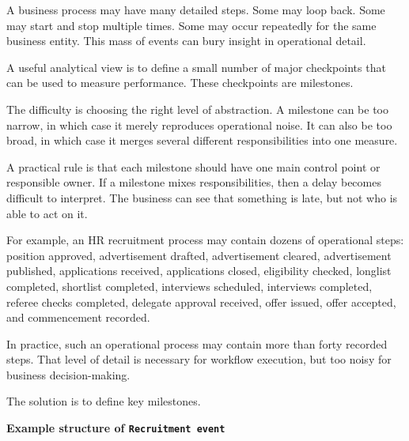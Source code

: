 \documentclass[10pt,openany,10pt]{book}
\begin{document}
A business process may have many detailed steps. Some may loop back.
Some may start and stop multiple times. Some may occur repeatedly for
the same business entity. This mass of events can bury insight in
operational detail.

A useful analytical view is to define a small number of major
checkpoints that can be used to measure performance. These checkpoints
are milestones.

The difficulty is choosing the right level of abstraction. A milestone
can be too narrow, in which case it merely reproduces operational noise.
It can also be too broad, in which case it merges several different
responsibilities into one measure.

A practical rule is that each milestone should have one main control
point or responsible owner. If a milestone mixes responsibilities, then
a delay becomes difficult to interpret. The business can see that
something is late, but not who is able to act on it.

For example, an HR recruitment process may contain dozens of operational
steps: position approved, advertisement drafted, advertisement cleared,
advertisement published, applications received, applications closed,
eligibility checked, longlist completed, shortlist completed, interviews
scheduled, interviews completed, referee checks completed, delegate
approval received, offer issued, offer accepted, and commencement
recorded.

In practice, such an operational process may contain more than forty
recorded steps. That level of detail is necessary for workflow
execution, but too noisy for business decision-making.

The solution is to define key milestones.

\textbf{Example structure of
\texttt{\textquotesingle{}Recruitment\ event\textquotesingle{}}}
\end{document}
